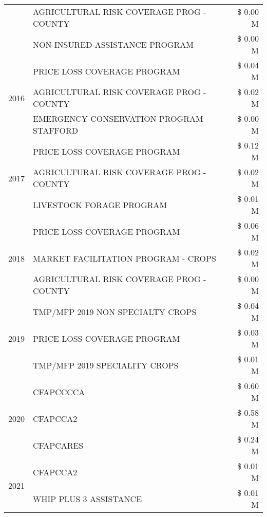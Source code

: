 \begin{tabular}{llr}
 & AGRICULTURAL RISK COVERAGE PROG - COUNTY & \$ 0.00 M \\
 & NON-INSURED ASSISTANCE PROGRAM & \$ 0.00 M \\
\cline{1-3}
\multirow[t]{3}{*}{2016} & PRICE LOSS COVERAGE PROGRAM & \$ 0.04 M \\
 & AGRICULTURAL RISK COVERAGE PROG - COUNTY & \$ 0.02 M \\
 & EMERGENCY CONSERVATION PROGRAM STAFFORD & \$ 0.00 M \\
\cline{1-3}
\multirow[t]{3}{*}{2017} & PRICE LOSS COVERAGE PROGRAM & \$ 0.12 M \\
 & AGRICULTURAL RISK COVERAGE PROG - COUNTY & \$ 0.02 M \\
 & LIVESTOCK FORAGE PROGRAM & \$ 0.01 M \\
\cline{1-3}
\multirow[t]{3}{*}{2018} & PRICE LOSS COVERAGE PROGRAM & \$ 0.06 M \\
 & MARKET FACILITATION PROGRAM - CROPS & \$ 0.02 M \\
 & AGRICULTURAL RISK COVERAGE PROG - COUNTY & \$ 0.00 M \\
\cline{1-3}
\multirow[t]{3}{*}{2019} & TMP/MFP 2019 NON SPECIALTY CROPS & \$ 0.04 M \\
 & PRICE LOSS COVERAGE PROGRAM & \$ 0.03 M \\
 & TMP/MFP 2019 SPECIALITY CROPS & \$ 0.01 M \\
\cline{1-3}
\multirow[t]{3}{*}{2020} & CFAPCCCCA & \$ 0.60 M \\
 & CFAPCCA2 & \$ 0.58 M \\
 & CFAPCARES & \$ 0.24 M \\
\cline{1-3}
\multirow[t]{2}{*}{2021} & CFAPCCA2 & \$ 0.01 M \\
 & WHIP PLUS 3 ASSISTANCE & \$ 0.01 M \\
\cline{1-3}
\bottomrule
\end{tabular}
